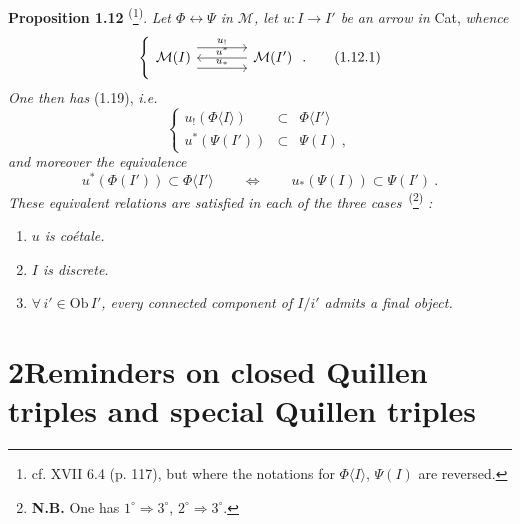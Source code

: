 \documentclass[11pt]{article}
\newcommand{\printedpage}[1]{\marginpar{\footnotesize p.~#1}}
\newcommand{\msp}[1]{\marginpar{\footnotesize [#1]}}
\newcommand{\clos}{\longleftrightarrow}
\newcommand{\fl}{\longrightarrow}
\begin{document}
\textbf{Proposition 1.12} \textsuperscript{(}\footnote[5]{cf. XVII 6.4 (p. 117), but where the notations for $\Phi\langle I\rangle$, $\Psi(I)$ are reversed.}\textsuperscript{)}. \textit{Let $\Phi \clos \Psi$ in $\mathcal{M}$, let $u : I \fl I'$ be an arrow in} Cat, \textit{whence}
\[
\left\{
\begin{tikzcd}[column sep=large]
\mathcal{M}(I) \arrow[r, shift left=3, "u_{!}"] \arrow[r, shift right=3, "u_{*}"] & \mathcal{M}(I') \arrow[l, "u^{*}"']
\end{tikzcd}
\right.
.
\tag*{(1.12.1)}
\]
\printedpage{8}
\textit{One then has} (1.19), \textit{i.e.}
\[
\left\{
\begin{array}{rcl}
u_{!}(\Phi\langle I\rangle) & \subset & \Phi\langle I'\rangle \\
u^{*}(\Psi(I')) & \subset & \Psi(I)\ ,
\end{array}
\right.
\tag*{(1.13.1)}
\]
\textit{and moreover the equivalence}
\[
u^{*}(\Phi(I')) \subset \Phi\langle I'\rangle \qquad \Longleftrightarrow \qquad u_{*}(\Psi(I)) \subset \Psi(I')\ . \tag*{(1.13.2)}
\]
\textit{These equivalent relations are satisfied in each of the three cases}~\textsuperscript{(}\footnote[6]{\textbf{N.B.} One has $1^{\circ} \Longrightarrow 3^{\circ}$, $2^{\circ} \Longrightarrow 3^{\circ}$.}\textsuperscript{)} \textit{:}
\begin{enumerate}[label={}]
\item[1°)] \textit{$u$ is coétale.}
\item[2°)] \textit{$I$ is discrete.}
\item[3°)] $\forall\, i' \in \mathrm{Ob}\, I'$\textit{, every connected component of $I/i'$ admits a final object.}
\end{enumerate}
\msp{page 13}

\section*{2\quad Reminders on closed Quillen triples and special Quillen triples}
\end{document}
